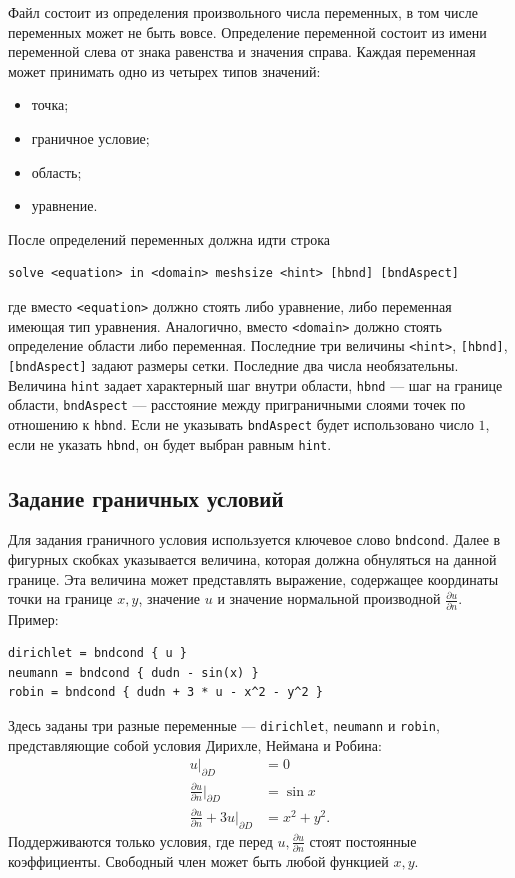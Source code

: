\documentclass[12pt]{article}
\newcommand{\pd}[2]{\frac{\partial #1}{\partial #2}}
\begin{document}
Файл состоит из определения произвольного числа переменных, в том числе переменных может не быть вовсе.
Определение переменной состоит из имени переменной слева от знака равенства и значения справа. Каждая переменная может принимать одно из четырех типов значений:
\begin{itemize}
	\item точка;
	\item граничное условие;
	\item область;
	\item уравнение.	
\end{itemize}

После определений переменных должна идти строка
\begin{verbatim}
solve <equation> in <domain> meshsize <hint> [hbnd] [bndAspect]
\end{verbatim}
где вместо \verb|<equation>| должно стоять либо уравнение, либо переменная имеющая тип уравнения. Аналогично, вместо \verb|<domain>| должно стоять определение области либо переменная. Последние три величины \verb|<hint>|, \verb|[hbnd]|, \verb|[bndAspect]| задают размеры сетки. Последние два числа необязательны. Величина \verb|hint| задает характерный шаг внутри области, \verb|hbnd| --- шаг на границе области, \verb|bndAspect| --- расстояние между приграничными слоями точек по отношению к \verb|hbnd|. Если не указывать \verb|bndAspect| будет использовано число $1$, если не указать \verb|hbnd|, он будет выбран равным \verb|hint|.

\subsection{Задание граничных условий}
Для задания граничного условия используется ключевое слово \verb|bndcond|. Далее в фигурных скобках указывается величина, которая должна обнуляться на данной границе. Эта величина может представлять выражение, содержащее координаты точки на границе $x, y$, значение $u$ и значение нормальной производной $\pd{u}{n}$. Пример:
\begin{verbatim}
dirichlet = bndcond { u }
neumann = bndcond { dudn - sin(x) }
robin = bndcond { dudn + 3 * u - x^2 - y^2 }
\end{verbatim}
Здесь заданы три разные переменные --- \verb|dirichlet|, \verb|neumann| и \verb|robin|, представляющие собой условия Дирихле, Неймана и Робина:
\begin{align*}
u\big|_{\partial D} &= 0\\
\pd{u}{n}\Big|_{\partial D} &= \sin x\\
\pd{u}{n} + 3u\Big|_{\partial D} &= x^2 + y^2.
\end{align*}
Поддерживаются только условия, где перед $u, \pd{u}{n}$ стоят постоянные коэффициенты. Свободный член может быть любой функцией $x, y$.
\end{document}

